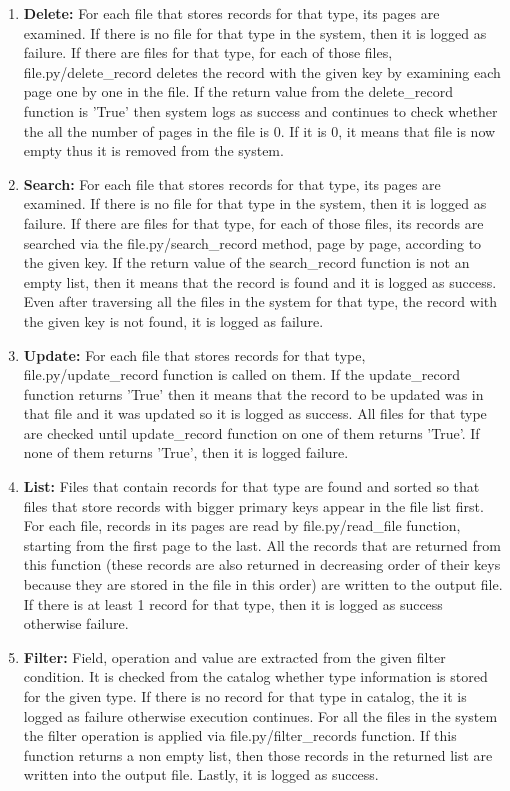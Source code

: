 \documentclass{article}
\begin{document}
\begin{enumerate}
    \item \textbf{Delete:} For each file that stores records for that type, its pages are examined. If there is no file for that type in the system, then it is logged as failure. If there are files for that type, for each of those files, file.py\slash delete\_record deletes the record with the given key by examining each page one by one in the file. If the return value from the delete\_record function is 'True' then system logs as success and continues to check whether the all the number of pages in the file is 0. If it is 0, it means that file is now empty thus it is removed from the system. 
    \item \textbf{Search:} For each file that stores records for that type, its pages are examined. If there is no file for that type in the system, then it is logged as failure. If there are files for that type, for each of those files, its records are searched via the file.py\slash search\_record method, page by page, according to the given key. If the return value of the search\_record function is not an empty list, then it means that the record is found and it is logged as success. Even after traversing all the files in the system for that type, the record with the given key is not found, it is logged as failure. 
    \item \textbf{Update:} For each file that stores records for that type, file.py\slash update\_record function is called on them. If the update\_record function returns 'True' then it means that the record to be updated was in that file and it was updated so it is logged as success. All files for that type are checked until update\_record function on one of them returns 'True'. If none of them returns 'True', then it is logged failure.
    \item \textbf{List:} Files that contain records for that type are found and sorted so that files that store records with bigger primary keys appear in the file list first. For each file, records in its pages are read by file.py\slash read\_file function, starting from the first page to the last. All the records that are returned from this function (these records are also returned in decreasing order of their keys because they are stored in the file in this order) are written to the output file. If there is at least 1 record for that type, then it is logged as success otherwise failure.
    \item \textbf{Filter:} Field, operation and value are extracted from the given filter condition. It is checked from the catalog whether type information is stored for the given type. If there is no record for that type in catalog, the it is logged as failure otherwise execution continues. For all the files in the system the filter operation is applied via file.py\slash filter\_records function. If this function returns a non empty list, then those records in the returned list are written into the output file. Lastly, it is logged as success.
\end{enumerate}
\end{document}

